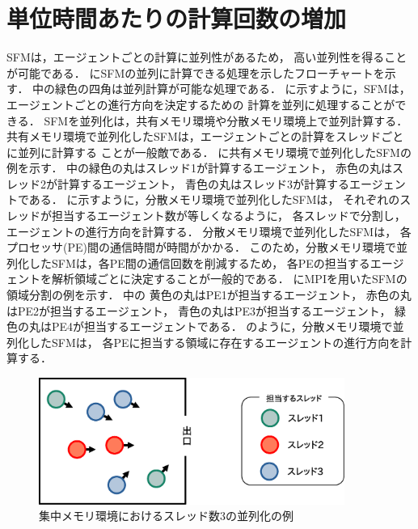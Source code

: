 \section{単位時間あたりの計算回数の増加}
SFMは，エージェントごとの計算に並列性があるため，
高い並列性を得ることが可能である．
にSFMの並列に計算できる処理を示したフローチャートを示す．
中の緑色の四角は並列計算が可能な処理である．
に示すように，SFMは，エージェントごとの進行方向を決定するための
計算を並列に処理することができる．
SFMを並列化は，共有メモリ環境や分散メモリ環境上で並列計算する．
共有メモリ環境で並列化したSFMは，エージェントごとの計算をスレッドごとに並列に計算する
ことが一般敵である\cite{seru_sfm1}\cite{seru_sfm2}．
に共有メモリ環境で並列化したSFMの例を示す．
中の緑色の丸はスレッド1が計算するエージェント，
赤色の丸はスレッド2が計算するエージェント，
青色の丸はスレッド3が計算するエージェントである．
に示すように，分散メモリ環境で並列化したSFMは，
それぞれのスレッドが担当するエージェント数が等しくなるように，
各スレッドで分割し，エージェントの進行方向を計算する．
分散メモリ環境で並列化したSFMは，
各プロセッサ(PE)間の通信時間が時間がかかる．
このため，分散メモリ環境で並列化したSFMは，各PE間の通信回数を削減するため，
各PEの担当するエージェントを解析領域ごとに決定することが一般的である．
にMPIを用いたSFMの領域分割の例を示す．
中の
黄色の丸はPE1が担当するエージェント，
赤色の丸はPE2が担当するエージェント，
青色の丸はPE3が担当するエージェント，
緑色の丸はPE4が担当するエージェントである．
のように，分散メモリ環境で並列化したSFMは，
各PEに担当する領域に存在するエージェントの進行方向を計算する．

\begin{figure}[t]
 \begin{center}
  \includegraphics[width=10cm,clip]{figure/sureddo_heiretu.eps}
  \caption{集中メモリ環境におけるスレッド数3の並列化の例}
  \label{fig:agent_heiretu}
 \end{center}
\end{figure}

